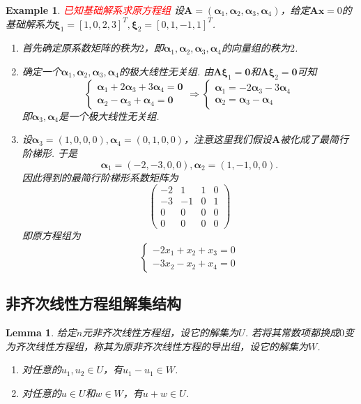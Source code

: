 \documentclass{article}
\newtheorem{lemma}[theorem]{Lemma}
\newtheorem{example}[theorem]{Example}
\newcommand{\mbf}[1]{\bm{#1}}
\newcommand{\redt}[1]{\textcolor{red}{#1}}
\begin{document}
\begin{example}
\rm \redt{已知基础解系求原方程组} 设$\mbf{A}=(\mbf{\alpha}_1,\mbf{\alpha}_2,\mbf{\alpha}_3,\mbf{\alpha}_4)$，给定$\mbf{A}\mbf{x} = 0$的基础解系为$\mbf{\xi}_1 = [1,0,2,3]^T, \mbf{\xi}_2=[0,1,-1,1]^T$. 

\begin{enumerate}
	\item 首先确定原系数矩阵的秩为$2$，即$\mbf{\alpha}_1,\mbf{\alpha}_2,\mbf{\alpha}_3,\mbf{\alpha}_4$的向量组的秩为$2$.
	\item 确定一个$\mbf{\alpha}_1,\mbf{\alpha}_2,\mbf{\alpha}_3,\mbf{\alpha}_4$的极大线性无关组. 由$\mbf{A}\mbf{\xi}_1 = \mbf{0}$和$\mbf{A}\mbf{\xi}_2=\mbf{0}$可知
	$$
	\left \{
	\begin{array}{ll}
	\mbf{\alpha}_1 + 2\mbf{\alpha}_3 + 3\mbf{\alpha}_4 = \mbf{0} \\
	\mbf{\alpha}_2 - \mbf{\alpha}_3 + \mbf{\alpha}_4 = \mbf{0}
	\end{array} \right .
	\Rightarrow \left \{
	\begin{array}{ll}
	\mbf{\alpha}_1  =  -2\mbf{\alpha}_3 - 3\mbf{\alpha}_4 \\
	\mbf{\alpha}_2 = \mbf{\alpha}_3 - \mbf{\alpha}_4 
	\end{array} \right .
	$$
	即$\mbf{\alpha}_3,\mbf{\alpha}_4$是一个极大线性无关组.
	\item 设$\mbf{\alpha}_3 = (1,0,0,0),\mbf{\alpha}_4 = (0,1,0,0)$，注意这里我们假设$\mbf{A}$被化成了最简行阶梯形. 于是
	$$
	\mbf{\alpha}_1 = (-2,-3,0,0), \mbf{\alpha}_2 = (1,-1,0,0).
	$$
	因此得到的最简行阶梯形系数矩阵为
	$$
	\begin{pmatrix}
	-2 & 1 & 1 & 0 \\
	-3 & -1 & 0 & 1 \\
	0 & 0 & 0 & 0 \\
	0 & 0 & 0 & 0 
	\end{pmatrix}
	$$
	即原方程组为
	$$
	\left \{
	\begin{array}{ll}
	-2x_1 + x_2 + x_3 = 0 \\
	-3x_2 -x_2 + x_4 = 0
	\end{array} \right.
	$$ 
\end{enumerate}
\end{example}

\subsection{非齐次线性方程组解集结构}

\begin{lemma}
\rm 给定$n$元非齐次线性方程组，设它的解集为$U$. 若将其常数项都换成$0$变为齐次线性方程组，称其为原非齐次线性方程的导出组，设它的解集为$W$. 
\begin{enumerate}
	\item 对任意的$u_1, u_2 \in U$，有$u_1-u_1 \in W$.
	\item 对任意的$u \in U$和$w \in W$，有$u+w \in U$.
\end{enumerate}
\end{lemma}
\end{document}
